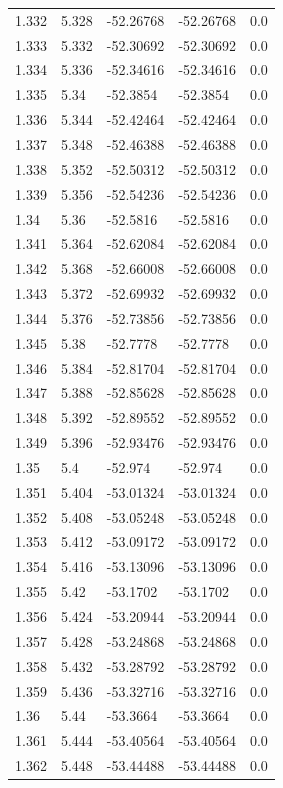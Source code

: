 \begin{tabular}{lllll}
1.332 & 5.328 & -52.26768 & -52.26768 & 0.0 \\
1.333 & 5.332 & -52.30692 & -52.30692 & 0.0 \\
1.334 & 5.336 & -52.34616 & -52.34616 & 0.0 \\
1.335 & 5.34 & -52.3854 & -52.3854 & 0.0 \\
1.336 & 5.344 & -52.42464 & -52.42464 & 0.0 \\
1.337 & 5.348 & -52.46388 & -52.46388 & 0.0 \\
1.338 & 5.352 & -52.50312 & -52.50312 & 0.0 \\
1.339 & 5.356 & -52.54236 & -52.54236 & 0.0 \\
1.34 & 5.36 & -52.5816 & -52.5816 & 0.0 \\
1.341 & 5.364 & -52.62084 & -52.62084 & 0.0 \\
1.342 & 5.368 & -52.66008 & -52.66008 & 0.0 \\
1.343 & 5.372 & -52.69932 & -52.69932 & 0.0 \\
1.344 & 5.376 & -52.73856 & -52.73856 & 0.0 \\
1.345 & 5.38 & -52.7778 & -52.7778 & 0.0 \\
1.346 & 5.384 & -52.81704 & -52.81704 & 0.0 \\
1.347 & 5.388 & -52.85628 & -52.85628 & 0.0 \\
1.348 & 5.392 & -52.89552 & -52.89552 & 0.0 \\
1.349 & 5.396 & -52.93476 & -52.93476 & 0.0 \\
1.35 & 5.4 & -52.974 & -52.974 & 0.0 \\
1.351 & 5.404 & -53.01324 & -53.01324 & 0.0 \\
1.352 & 5.408 & -53.05248 & -53.05248 & 0.0 \\
1.353 & 5.412 & -53.09172 & -53.09172 & 0.0 \\
1.354 & 5.416 & -53.13096 & -53.13096 & 0.0 \\
1.355 & 5.42 & -53.1702 & -53.1702 & 0.0 \\
1.356 & 5.424 & -53.20944 & -53.20944 & 0.0 \\
1.357 & 5.428 & -53.24868 & -53.24868 & 0.0 \\
1.358 & 5.432 & -53.28792 & -53.28792 & 0.0 \\
1.359 & 5.436 & -53.32716 & -53.32716 & 0.0 \\
1.36 & 5.44 & -53.3664 & -53.3664 & 0.0 \\
1.361 & 5.444 & -53.40564 & -53.40564 & 0.0 \\
1.362 & 5.448 & -53.44488 & -53.44488 & 0.0 \\

\end{tabular}
